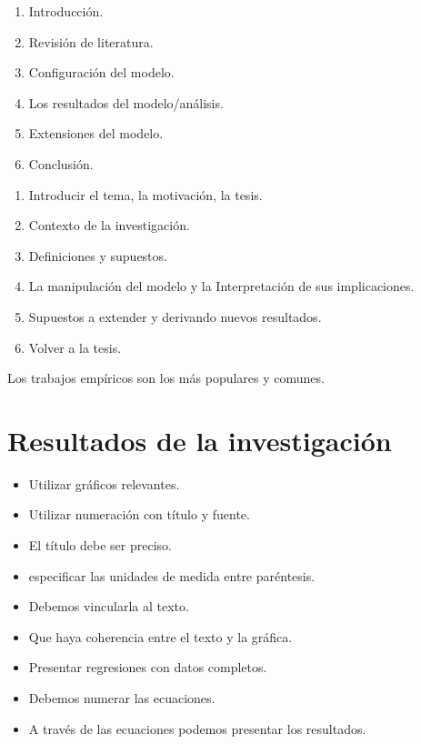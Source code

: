 \begin{multicols}{2}
    \begin{enumerate}[1.]
	\item Introducción.
	\item Revisión de literatura.
	\item Configuración del modelo.
	\item Los resultados del modelo/análisis.	
	\item Extensiones del modelo.
	\item Conclusión.
    \end{enumerate}

    \begin{enumerate}[1.]
	\item Introducir el tema, la motivación, la tesis.
	\item Contexto de la investigación.
	\item Definiciones y supuestos.
	\item La manipulación del modelo y la Interpretación de sus implicaciones.
	\item Supuestos a extender y derivando nuevos resultados.
	\item Volver a la tesis.
    \end{enumerate}
\end{multicols}

Los trabajos empíricos son los más populares y comunes. 

\section{Resultados de la investigación}
\begin{itemize}
    \item Utilizar gráficos relevantes. 
    \item Utilizar numeración con título y fuente.
    \item El título debe ser preciso. 
    \item especificar las unidades de medida entre paréntesis.
    \item Debemos vincularla al texto.
    \item Que haya coherencia entre el texto y la gráfica.
    \item Presentar regresiones con datos completos.
    \item Debemos numerar las ecuaciones.
    \item A través de las ecuaciones podemos presentar los resultados.
\end{itemize}

